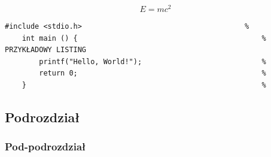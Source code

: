 \lipsum[2] \cite{min2017deep} %

\begin{equ}[!ht]                        %
  \begin{equation}                      %
    E=mc^2                              %
  \end{equation}                        %
\end{equ}                               %

\lipsum[2] %

\begin{lstlisting}[caption=Podpis listingu,label=code1]     %
    #include <stdio.h>                                      %
    int main () {                                           %      PRZYKŁADOWY LISTING
        printf("Hello, World!");                            %
        return 0;                                           %
    }                                                       %
\end{lstlisting}                                            %

\subsection{Podrozdział}

\lipsum[1-15]    %

\subsubsection{Pod-podrozdział}

\lipsum[1-5]    %
